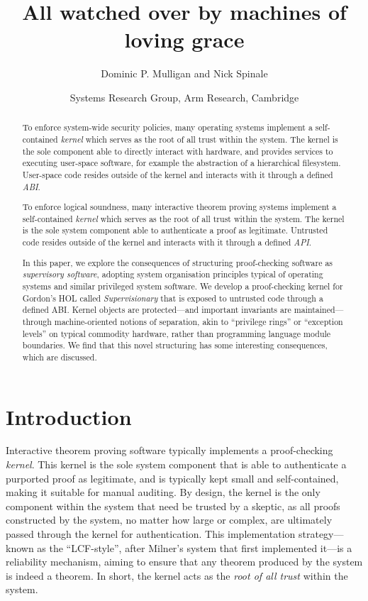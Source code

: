 \documentclass[a4paper, 10pt]{article}
\title{All watched over by machines of loving grace}
\author{Dominic P. Mulligan and Nick Spinale}
\date{Systems Research Group, Arm Research, Cambridge}
\begin{document}
\maketitle

\begin{abstract}
To enforce system-wide security policies, many operating systems implement a self-contained \emph{kernel} which serves as the root of all trust within the system.
The kernel is the sole component able to directly interact with hardware, and provides services to executing user-space software, for example the abstraction of a hierarchical filesystem.
User-space code resides outside of the kernel and interacts with it through a defined \emph{ABI}.

To enforce logical soundness, many interactive theorem proving systems implement a self-contained \emph{kernel} which serves as the root of all trust within the system.
The kernel is the sole system component able to authenticate a proof as legitimate.
Untrusted code resides outside of the kernel and interacts with it through a defined \emph{API}.

In this paper, we explore the consequences of structuring proof-checking software as \emph{supervisory software}, adopting system organisation principles typical of operating systems and similar privileged system software.
We develop a proof-checking kernel for Gordon's HOL called \emph{Supervisionary} that is exposed to untrusted code through a defined ABI.
Kernel objects are protected---and important invariants are maintained---through machine-oriented notions of separation, akin to ``privilege rings'' or ``exception levels'' on typical commodity hardware, rather than programming language module boundaries.
We find that this novel structuring has some interesting consequences, which are discussed.
\end{abstract}

\section{Introduction}
\label{sect.introduction}

Interactive theorem proving software typically implements a proof-checking \emph{kernel}.
This kernel is the sole system component that is able to authenticate a purported proof as legitimate, and is typically kept small and self-contained, making it suitable for manual auditing.
By design, the kernel is the only component within the system that need be trusted by a skeptic, as all proofs constructed by the system, no matter how large or complex, are ultimately passed through the kernel for authentication.
This implementation strategy---known as the ``LCF-style'', after Milner's system that first implemented it---is a reliability mechanism, aiming to ensure that any theorem produced by the system is indeed a theorem.
In short, the kernel acts as the \emph{root of all trust} within the system.
\end{document}
